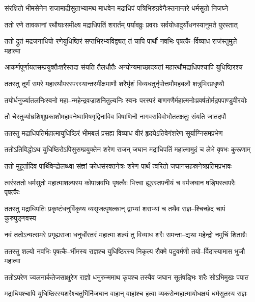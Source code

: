 \twolineshloka
{संरक्षितो भीमसेनेन राजामाद्रीसुताभ्यामथ माधवेन}
{मद्राधिपं पत्रिभिरुग्रवेगैःस्तनान्तरे धर्मसुतो निजघ्ने}


\twolineshloka
{ततो रणे तावकानां रथौघाःसमीक्ष्य मद्राधिपतिं शरार्तम्}
{पर्यावव्रुः प्रवराः सर्वयोधादुर्योधनस्यानुमते पुरस्तात्}


\twolineshloka
{ततो द्रुतं मद्रजनाधिपो रणेयुधिष्ठिरं सप्तभिरभ्यविद्व्यत्}
{तं चापि पार्थौ नवभिः पृषत्कै--र्विव्याध राजंस्तुमुले महात्मा}


\twolineshloka
{आकर्णपूर्णायतसम्प्रयुक्तैःशरैस्तदा संयति तैलधौतैः}
{अन्योन्यमाच्छादयतां महारथौमद्राधिपश्चापि युधिष्ठिरश्च}


\twolineshloka
{ततस्तु तूर्णं समरे महारथौपरस्परस्यान्तरमीक्षमाणौ}
{शरैर्भृशं विव्यधतुर्नृपोत्तमौमहबलौ शत्रुभिरप्रधृष्यौ}


\twolineshloka
{तयोर्धनुर्ज्यातलनिःस्वनो महा--न्महेन्द्रवज्राशनितुल्यनिः स्वनः}
{परस्परं बाणगणैर्महात्मनोःप्रवर्षतोर्मद्रपपाण्डुवीरयोः}


\twolineshloka
{तौ चेरतुर्व्याघ्रशिशुप्रकाशौमहावनेष्वामिषगृद्विनाविव}
{विषाणिनौ नागवराविवोभौततक्षतुः संयति जातदर्पौ}


\twolineshloka
{ततस्तु मद्राधिपतिर्महात्मायुधिष्ठिरं भीमबलं प्रसह्य}
{विव्याध वीरं हृदयेऽतिवेगंशरेण सूर्याग्निसमप्रभेण}


\twolineshloka
{ततोऽतिविद्धोऽथ युधिष्ठिरोऽपिसुसम्प्रयुक्तेन शरेण राजन्}
{जघान मद्राधिपतिं महात्मामुदं च लेभे वृषभः कुरूणाम्}


\twolineshloka
{ततो मुहूर्तादिव पार्थिवेन्द्रोलब्ध्वा संज्ञां क्रोधसंरक्तनेत्रः}
{शरेण पार्थं त्वरितो जघानसहस्रनेत्रप्रतिमप्रभावः}


\twolineshloka
{त्वरंस्ततो धर्मसुतो महात्माशल्यस्य कोपान्नवभिः पृषत्कैः}
{भित्त्वा ह्युरस्तपनीयं च वर्मजघान षड्भिस्त्वपरैः पृषत्कैः}


\twolineshloka
{ततस्तु मद्राधिपतिः प्रकृष्टंधनुर्विकृष्य व्यसृजत्पृषत्कान्}
{द्वाभ्यां शराभ्यां च तथैव राज्ञ--श्चिच्छेद चापं कुरुपुङ्गवस्य}


\twolineshloka
{नवं ततोऽन्यत्समरे प्रगृह्यराजा धनुर्धोरतरं महात्मा}
{शल्यं तु विव्याध शरैः समन्ता--द्यथा महेन्द्रो नमुचिं शिताग्रैः}


\twolineshloka
{ततस्तु शल्यो नवभिः पृषत्कै--र्भीमस्य राज्ञश्च युधिष्ठिरस्य}
{निकृत्य रौक्मे पटुवर्मणी तयो--र्विदास्यामास भुजौ महात्मा}


\twolineshloka
{ततोऽपरेण ज्वलनार्कतेजसाक्षुरेण राज्ञो धनुरुन्ममाथ}
{कृपश्च तस्यैव जघान सूतंषड्भिः शरैः सोऽभिमुखः पपात}


\twolineshloka
{मद्राधिपश्चापि युधिष्ठिरस्यशरैश्चतुर्भिर्निजघान वाहान्}
{वाहांश्च हत्वा व्यकरोन्महात्मायोधक्षयं धर्मसुतस्य राज्ञः}


